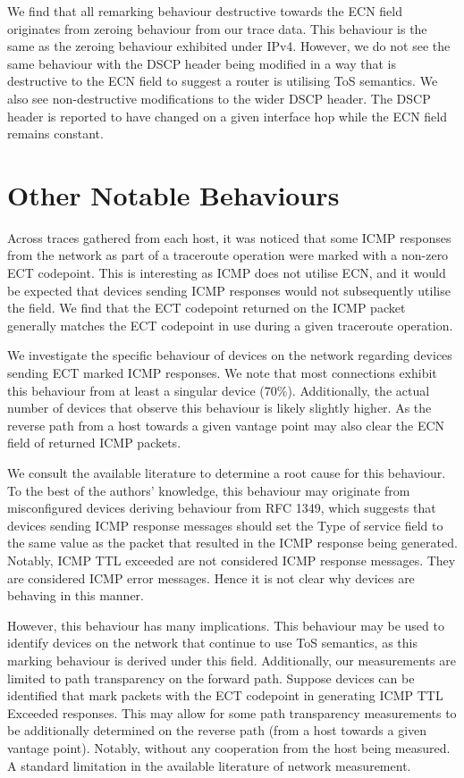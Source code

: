 \documentclass{l4proj}
\begin{document}
We find that all remarking behaviour destructive towards the ECN field originates from zeroing behaviour from our trace data. This behaviour is the same as the zeroing behaviour exhibited under IPv4. However, we do not see the same behaviour with the DSCP header being modified in a way that is destructive to the ECN field to suggest a router is utilising ToS semantics. We also see non-destructive modifications to the wider DSCP header. The DSCP header is reported to have changed on a given interface hop while the ECN field remains constant. 

\section{Other Notable Behaviours}
\label{sec:other}

Across traces gathered from each host, it was noticed that some ICMP responses from the network as part of a traceroute operation were marked with a non-zero ECT codepoint. This is interesting as ICMP does not utilise ECN, and it would be expected that devices sending ICMP responses would not subsequently utilise the field. We find that the ECT codepoint returned on the ICMP packet generally matches the ECT codepoint in use during a given traceroute operation.

We investigate the specific behaviour of devices on the network regarding devices sending ECT marked ICMP responses. We note that most connections exhibit this behaviour from at least a singular device (70\%). Additionally, the actual number of devices that observe this behaviour is likely slightly higher. As the reverse path from a host towards a given vantage point may also clear the ECN field of returned ICMP packets.

We consult the available literature to determine a root cause for this behaviour. To the best of the authors' knowledge, this behaviour may originate from misconfigured devices deriving behaviour from RFC 1349, which suggests that devices sending ICMP response messages should set the Type of service field to the same value as the packet that resulted in the ICMP response being generated\cite{rfc1349}. Notably, ICMP TTL exceeded are not considered ICMP response messages. They are considered ICMP error messages. Hence it is not clear why devices are behaving in this manner.

However, this behaviour has many implications. This behaviour may be used to identify devices on the network that continue to use ToS semantics, as this marking behaviour is derived under this field. Additionally, our measurements are limited to path transparency on the forward path. Suppose devices can be identified that mark packets with the ECT codepoint in generating ICMP TTL Exceeded responses. This may allow for some path transparency measurements to be additionally determined on the reverse path (from a host towards a given vantage point). Notably, without any cooperation from the host being measured. A standard limitation in the available literature of network measurement.
\end{document}
